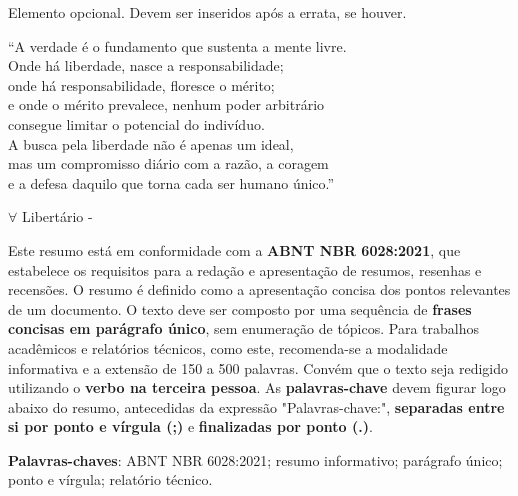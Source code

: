 \documentclass{Arquivos/TrabalhoAcademico}
\begin{document}
Elemento opcional. Devem ser inseridos após a errata, se houver.






\begin{epigrafe}
    ``A verdade é o fundamento que sustenta a mente livre.\\
    Onde há liberdade, nasce a responsabilidade;\\
    onde há responsabilidade, floresce o mérito;\\
    e onde o mérito prevalece, nenhum poder arbitrário\\
    consegue limitar o potencial do indivíduo.\\
    A busca pela liberdade não é apenas um ideal,\\
    mas um compromisso diário com a razão, a coragem\\
    e a defesa daquilo que torna cada ser humano único.''
    
    $\forall$ Libertário - \WenesTex
\end{epigrafe}








\begin{resumo}
Este resumo está em conformidade com a \textbf{ABNT NBR 6028:2021}, que estabelece os requisitos para a redação e apresentação de resumos, resenhas e recensões. O resumo é definido como a apresentação concisa dos pontos relevantes de um documento. O texto deve ser composto por uma sequência de \textbf{frases concisas em parágrafo único}, sem enumeração de tópicos. Para trabalhos acadêmicos e relatórios técnicos, como este, recomenda-se a modalidade informativa e a extensão de 150 a 500 palavras. Convém que o texto seja redigido utilizando o \textbf{verbo na terceira pessoa}. As \textbf{palavras-chave} devem figurar logo abaixo do resumo, antecedidas da expressão "Palavras-chave:", \textbf{separadas entre si por ponto e vírgula (;)} e \textbf{finalizadas por ponto (.)}.

\textbf{Palavras-chaves}: ABNT NBR 6028:2021; resumo informativo; parágrafo único; ponto e vírgula; relatório técnico.
\end{resumo}
\end{document}
